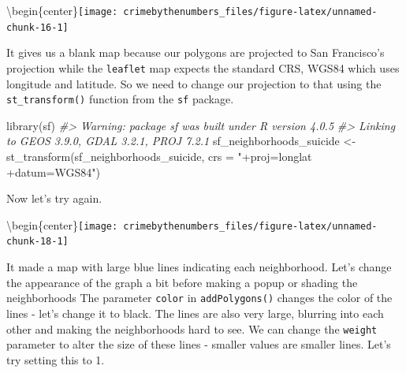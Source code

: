 \documentclass[
  12pt,
  openany]{book}
\newenvironment{Shaded}{\begin{snugshade}}{\end{snugshade}}
\newcommand{\AttributeTok}[1]{\textcolor[rgb]{0.61,0.61,0.61}{#1}}
\newcommand{\CommentTok}[1]{\textcolor[rgb]{0.37,0.37,0.37}{\textit{#1}}}
\newcommand{\FunctionTok}[1]{\textcolor[rgb]{0,0,0}{#1}}
\newcommand{\NormalTok}[1]{#1}
\newcommand{\OtherTok}[1]{\textcolor[rgb]{0.37,0.37,0.37}{#1}}
\newcommand{\SpecialCharTok}[1]{\textcolor[rgb]{0,0,0}{#1}}
\newcommand{\StringTok}[1]{\textcolor[rgb]{0.5,0.5,0.5}{#1}}
\begin{document}
\textbackslash begin\{center\}\texttt{[image: crimebythenumbers\_files/figure-latex/unnamed-chunk-16-1]}

It gives us a blank map because our polygons are projected to San Francisco's projection while the \texttt{leaflet} map expects the standard CRS, WGS84 which uses longitude and latitude. So we need to change our projection to that using the \texttt{st\_transform()} function from the \texttt{sf} package.

\begin{Shaded}
\begin{Highlighting}[]
\FunctionTok{library}\NormalTok{(sf)}
\CommentTok{\#\textgreater{} Warning: package \textquotesingle{}sf\textquotesingle{} was built under R version 4.0.5}
\CommentTok{\#\textgreater{} Linking to GEOS 3.9.0, GDAL 3.2.1, PROJ 7.2.1}
\NormalTok{sf\_neighborhoods\_suicide }\OtherTok{\textless{}{-}} \FunctionTok{st\_transform}\NormalTok{(sf\_neighborhoods\_suicide,}
                                        \AttributeTok{crs =} \StringTok{"+proj=longlat +datum=WGS84"}\NormalTok{)}
\end{Highlighting}
\end{Shaded}

Now let's try again.

\begin{Shaded}
\end{Shaded}

\textbackslash begin\{center\}\texttt{[image: crimebythenumbers\_files/figure-latex/unnamed-chunk-18-1]}

It made a map with large blue lines indicating each neighborhood. Let's change the appearance of the graph a bit before making a popup or shading the neighborhoods The parameter \texttt{color} in \texttt{addPolygons()} changes the color of the lines - let's change it to black. The lines are also very large, blurring into each other and making the neighborhoods hard to see. We can change the \texttt{weight} parameter to alter the size of these lines - smaller values are smaller lines. Let's try setting this to 1.
\end{document}
